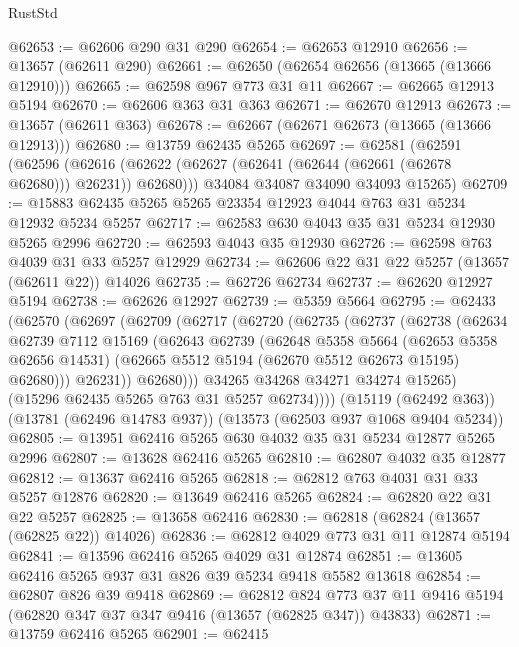 \begin{lexlean}{RustStd}
\begin{coremodule}
@62653 := @62606 @290 @31 @290
@62654 := @62653 @12910
@62656 := @13657 (@62611 @290)
@62661 := @62650 (@62654 @62656 (@13665 (@13666 @12910)))
@62665 := @62598 @967 @773 @31 @11
@62667 := @62665 @12913 @5194
@62670 := @62606 @363 @31 @363
@62671 := @62670 @12913
@62673 := @13657 (@62611 @363)
@62678 := @62667 (@62671 @62673 (@13665 (@13666 @12913)))
@62680 := @13759 @62435 @5265
@62697 := @62581
    (@62591
      (@62596 (@62616 (@62622 (@62627 (@62641 (@62644 (@62661 (@62678 @62680))) @26231)) @62680)))
      @34084
      @34087
      @34090
      @34093
      @15265)
@62709 := @15883 @62435 @5265 @5265 @23354 @12923 @4044 @763 @31 @5234 @12932 @5234 @5257
@62717 := @62583 @630 @4043 @35 @31 @5234 @12930 @5265 @2996
@62720 := @62593 @4043 @35 @12930
@62726 := @62598 @763 @4039 @31 @33 @5257 @12929
@62734 := @62606 @22 @31 @22 @5257 (@13657 (@62611 @22)) @14026
@62735 := @62726 @62734
@62737 := @62620 @12927 @5194
@62738 := @62626 @12927
@62739 := @5359 @5664
@62795 := @62433
    (@62570
      (@62697
        (@62709
          (@62717
            (@62720
              (@62735
                (@62737
                  (@62738
                    (@62634
                      @62739
                      @7112
                      @15169
                      (@62643
                        @62739
                        (@62648
                          @5358
                          @5664
                          (@62653 @5358 @62656 @14531)
                          (@62665 @5512 @5194 (@62670 @5512 @62673 @15195) @62680)))
                      @26231))
                  @62680)))
            @34265
            @34268
            @34271
            @34274
            @15265)
          (@15296 @62435 @5265 @763 @31 @5257 @62734))))
    (@15119 (@62492 @363))
    (@13781 (@62496 @14783 @937))
    (@13573 (@62503 @937 @1068 @9404 @5234))
@62805 := @13951 @62416 @5265 @630 @4032 @35 @31 @5234 @12877 @5265 @2996
@62807 := @13628 @62416 @5265
@62810 := @62807 @4032 @35 @12877
@62812 := @13637 @62416 @5265
@62818 := @62812 @763 @4031 @31 @33 @5257 @12876
@62820 := @13649 @62416 @5265
@62824 := @62820 @22 @31 @22 @5257
@62825 := @13658 @62416
@62830 := @62818 (@62824 (@13657 (@62825 @22)) @14026)
@62836 := @62812 @4029 @773 @31 @11 @12874 @5194
@62841 := @13596 @62416 @5265 @4029 @31 @12874
@62851 := @13605 @62416 @5265 @937 @31 @826 @39 @5234 @9418 @5582 @13618
@62854 := @62807 @826 @39 @9418
@62869 := @62812
    @824
    @773
    @37
    @11
    @9416
    @5194
    (@62820 @347 @37 @347 @9416 (@13657 (@62825 @347)) @43833)
@62871 := @13759 @62416 @5265
@62901 := @62415

\end{coremodule}
\end{lexlean}
